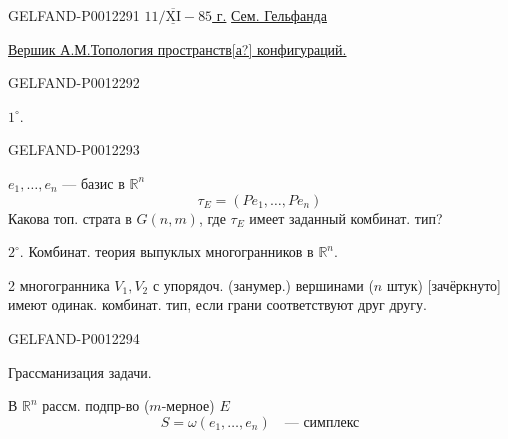 \begin{GelfandAdjacentEvidence}{GELFAND-P001229}{1}
\underline{\(11/\overline{\underline{\mathrm{XI}}}-85\) г.}\qquad
\underline{Сем. Гельфанда}

\underline{\underline{Вершик А.М.}}\qquad \underline{Топология пространств[а?] конфигураций.}
\end{GelfandAdjacentEvidence}
\begin{GelfandAdjacentEvidence}{GELFAND-P001229}{2}


\(1^{\circ}.\)
\end{GelfandAdjacentEvidence}
\begin{GelfandAdjacentEvidence}{GELFAND-P001229}{3}

\(e_1,\ldots,e_n\) --- базис в \(\mathbb R^n\)
\begin{equation*}
\tau_E=(Pe_1,\ldots,Pe_n)
\end{equation*}
Какова топ. страта в \(G(n,m)\), где \(\tau_E\) имеет заданный комбинат. тип?

\(2^{\circ}.\) Комбинат. теория выпуклых многогранников в \(\mathbb R^n\).

2 многогранника \(V_1,V_2\) с упорядоч. (занумер.) вершинами (\(n\) штук)
[зачёркнуто] имеют одинак. комбинат. тип, если грани соответствуют друг другу.
\end{GelfandAdjacentEvidence}
\begin{GelfandAdjacentEvidence}{GELFAND-P001229}{4}


Грассманизация задачи.

В \(\mathbb R^n\) рассм. подпр-во (\(m\)-мерное) \(E\)
\begin{equation*}
S=\omega(e_1,\ldots,e_n)\quad\text{--- симплекс}
\end{equation*}
\end{GelfandAdjacentEvidence}
